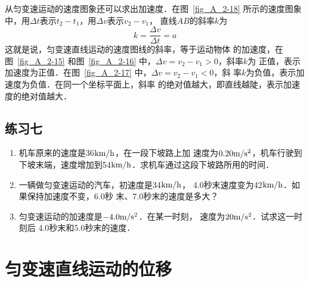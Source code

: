     从匀变速运动的速度图象还可以求出加速度．在图~\ref{fig_A_2-18} 所示的速度图象中，用$\Delta t$表示$t_2-t_1$，用$\Delta v$表示$v_2-v_1$，
直线$AB$的斜率$k$为
\[k=\frac{\Delta v}{\Delta t}=a \]
这就是说，匀变速直线运动的速度图线的斜率，等于运动物体
的加速度，在图~\ref{fig_A_2-15} 和图~\ref{fig_A_2-16} 中，$\Delta v=v_2-v_1>0$，斜率$k$为
正值，表示加速度为正值．在图~\ref{fig_A_2-17} 中，$\Delta v=v_2-v_1<0$，斜
率$k$为负值，表示加速度为负值．在同一个坐标平面上，斜率
的绝对值越大，即直线越陡，表示加速度的绝对值越大．

\subsection*{练习七}
\begin{enumerate}
\item 机车原来的速度是36$\text{km}/\text{h}$，在一段下坡路上加
速度为$0.20\text{m}/\text{s}^2$，机车行驶到下坡末端，速度增加到54$\text{km}/\text{h}$．求机车通过这段下坡路所用的时间．
\item 一辆做匀变速运动的汽车，初速度是34$\text{km}/\text{h}$，
4.0秒末速度变为42$\text{km}/\text{h}$．如果保持加速度不变，6.0秒
末、7.0秒末的速度是多大？
\item 匀变速运动的加速度是$-4.0\text{m}/\text{s}^2$．在某一时刻，
速度为$20\text{m}/\text{s}^2$．试求这一时刻后 4.0秒末和5.0秒末的速度．
\end{enumerate}

\section{匀变速直线运动的位移}
 

